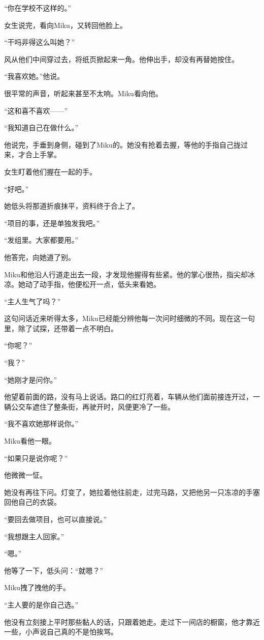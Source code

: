 “你在学校不这样的。”

女生说完，看向Miku，又转回他脸上。

“干吗非得这么叫她？”

风从他们中间穿过去，将纸页掀起来一角。他伸出手，却没有再替她按住。

“我喜欢她。”他说。

很平常的声音，听起来甚至不太响。Miku看向他。

“这和喜不喜欢——”

“我知道自己在做什么。”

他说完，手垂到身侧，碰到了Miku的。她没有抢着去握，等他的手指自己拢过来，才合上手掌。

女生盯着他们握在一起的手。

“好吧。”

她低头将那道折痕抹平，资料终于合上了。

“项目的事，还是单独发我吧。”

“发组里。大家都要用。”

他答完，向她道了别。

Miku和他沿人行道走出去一段，才发现他握得有些紧。他的掌心很热，指尖却冰凉。她动了动手指，他便松开一点，低头来看她。

“主人生气了吗？”

这句问话近来听得太多，Miku已经能分辨他每一次问时细微的不同。现在这一句里，除了试探，还带着一点不明白。

“你呢？”

“我？”

“她刚才是问你。”

他望着前面的路，没有马上说话。路口的红灯亮着，车辆从他们面前接连开过，一辆公交车遮住了整条街，再驶开时，风便更冷了一些。

“我不喜欢她那样说你。”

Miku看他一眼。

“如果只是说你呢？”

他微微一怔。

她没有再往下问。灯变了，她拉着他往前走，过完马路，又把他另一只冻凉的手塞回他自己的衣袋。

“要回去做项目，也可以直接说。”

“我想跟主人回家。”

“嗯。”

他等了一下，低头问：“就嗯？”

Miku拽了拽他的手。

“主人要的是你自己选。”

他没有立刻接上平时那些黏人的话，只跟着她走。走过下一间店的橱窗，他才靠近一些，小声说自己真的不是怕挨骂。

